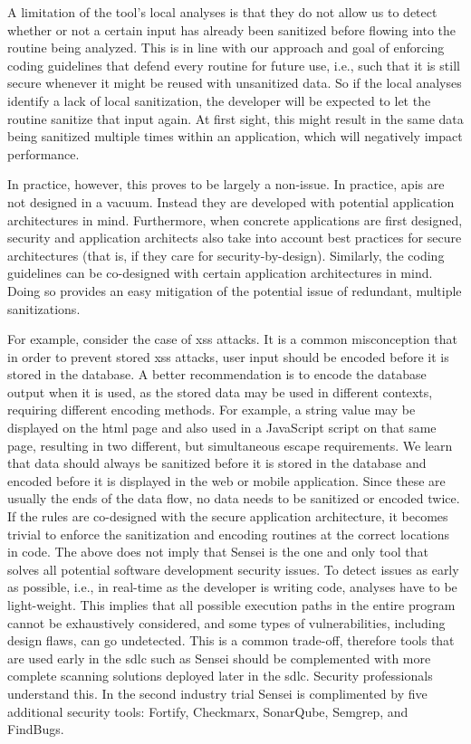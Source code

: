 A limitation of the tool's local analyses is that they do not allow us to detect whether or not a certain input has already been sanitized before flowing into the routine being analyzed.
This is in line with our approach and goal of enforcing coding guidelines that defend every routine for future use, i.e., such that it is still secure whenever it might be reused with unsanitized data.
So if the local analyses identify a lack of local sanitization, the developer will be expected to let the routine sanitize that input again.
At first sight, this might result in the same data being sanitized multiple times within an application, which will negatively impact performance. 

In practice, however, this proves to be largely a non-issue.
In practice, \glspl{api} are not designed in a vacuum.
Instead they are developed with potential application architectures in mind.
Furthermore, when concrete applications are first designed, security and application architects also take into account best practices for secure architectures (that is, if they care for security-by-design).
Similarly, the coding guidelines can be co-designed with certain application architectures in mind.
Doing so provides an easy mitigation of the potential issue of redundant, multiple sanitizations.

For example, consider the case of \gls{xss} attacks.
It is a common misconception that in order to prevent stored \gls{xss} attacks, user input should be encoded before it is stored in the database.
A better recommendation is to encode the database output when it is used, as the stored data may be used in different contexts, requiring different encoding methods.
For example, a string value may be displayed on the \gls{html} page and also used in a JavaScript script on that same page, resulting in two different, but simultaneous escape requirements.
We learn that data should always be sanitized before it is stored in the database and encoded before it is displayed in the web or mobile application.
Since these are usually the ends of the data flow, no data needs to be sanitized or encoded twice.
If the rules are co-designed with the secure application architecture, it becomes trivial to enforce the sanitization and encoding routines at the correct locations in code. 
The above does not imply that Sensei is the one and only tool that solves all potential software development security issues.
To detect issues as early as possible, i.e., in real-time as the developer is writing code, analyses have to be light-weight.
This implies that all possible execution paths in the entire program cannot be exhaustively considered, and some types of vulnerabilities, including design flaws, can go undetected.
This is a common trade-off, therefore tools that are used early in the \gls{sdlc} such as Sensei should be complemented with more complete scanning solutions deployed later in the \gls{sdlc}.
Security professionals understand this.
In the second industry trial Sensei is complimented by five additional security tools: Fortify, Checkmarx, SonarQube, Semgrep, and FindBugs.

